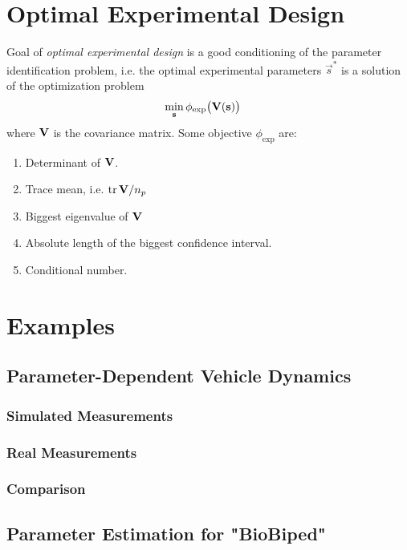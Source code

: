 	\section{Optimal Experimental Design}
		Goal of \emph{optimal experimental design} is a good conditioning of the parameter identification problem, i.e. the optimal experimental parameters \( \vec{s}^\ast \) is a solution of the optimization problem
		\begin{align*}
			\min_{\boldsymbol{\mathrm{s}}} &\, \phi_\mathrm{exp}\big(\boldsymbol{\mathrm{V}}(\boldsymbol{\mathrm{s}})\big)
		\end{align*}
		where \(\boldsymbol{\mathrm{V}}\) is the covariance matrix. Some objective \(\phi_\mathrm{exp}\) are:
		\begin{enumerate}
			\item Determinant of \(\boldsymbol{\mathrm{V}}\).
			\item Trace mean, i.e. \( \tr \boldsymbol{\mathrm{V}} / n_p \)
			\item Biggest eigenvalue of \(\boldsymbol{\mathrm{V}}\)
			\item Absolute length of the biggest confidence interval.
			\item Conditional number.
		\end{enumerate}

	\section{Examples} %

		\subsection{Parameter-Dependent Vehicle Dynamics} %

			\subsubsection{Simulated Measurements} %

			\subsubsection{Real Measurements} %

			\subsubsection{Comparison} %

		\subsection{Parameter Estimation for "BioBiped"} %
